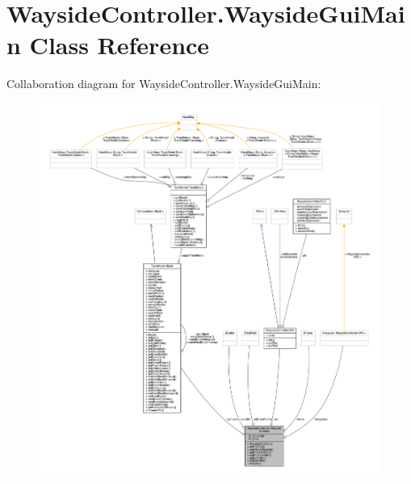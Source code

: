 \hypertarget{classWaysideController_1_1WaysideGuiMain}{}\section{Wayside\+Controller.\+Wayside\+Gui\+Main Class Reference}
\label{classWaysideController_1_1WaysideGuiMain}


Collaboration diagram for Wayside\+Controller.\+Wayside\+Gui\+Main\+:
\nopagebreak
\begin{figure}[H]
\begin{center}
\leavevmode
\includegraphics[width=350pt]{classWaysideController_1_1WaysideGuiMain__coll__graph}
\end{center}
\end{figure}
